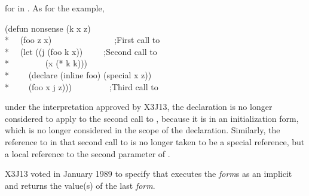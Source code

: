 \begin{defspec}
\begin{new}
for  in .  As for the  example,
\begin{lisp}
(defun nonsense (k x z) \\*
~~(foo z x)~~~~~~~~~~~~~~~;\textrm{First call to } \\*
~~(let ((j (foo k x))~~~~~;\textrm{Second call to } \\*
~~~~~~~~(x (* k k))) \\*
~~~~(declare (inline foo) (special x z)) \\*
~~~~(foo x j z)))~~~~~~~~~;\textrm{Third call to }
\end{lisp}
under the interpretation approved by X3J13, the 
declaration is no longer considered to apply to the second
call to , because it is in an initialization form, which is
no longer considered in the scope of the declaration.  Similarly,
the reference to  in that second call to  is no longer
taken to be a special reference, but a local reference to the second
parameter of .
\end{new}
\end{defspec}

\begin{new}
X3J13 voted in January 1989
to specify that  executes the \emph{form\/}s as an implicit
 and returns the value(s) of the last \emph{form}.
\end{new}

